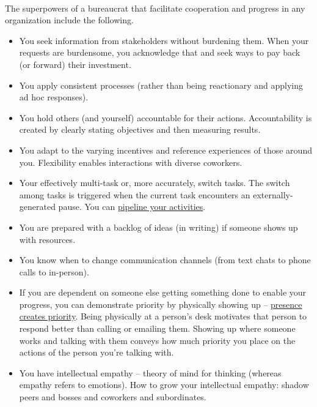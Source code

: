 \ \\

The superpowers of a bureaucrat that facilitate cooperation and progress in any organization include the following.
\begin{itemize}
\item You seek information from stakeholders without burdening them. When your requests are burdensome, you acknowledge that and seek ways to pay back (or forward) their investment.
\item You apply consistent processes (rather than being reactionary and applying ad hoc responses).
\item You hold others (and yourself) accountable for their actions. Accountability is created by clearly stating objectives and then measuring results.
\item You adapt to the varying incentives and reference experiences of those around you. Flexibility enables interactions with diverse coworkers. 
    \item Your effectively multi-task or, more accurately, switch tasks. The switch among tasks is triggered when the current task encounters an externally-generated pause. You can \href{https://en.wikipedia.org/wiki/Pipeline_(computing)#Concept_and_motivation}{pipeline your activities}.
\iftoggle{WPinmargin}{\marginpar{$>$Wikipedia: pipeline (computing)}}{}
    \item You are prepared with a backlog of ideas (in writing) if someone shows up with resources.
    \item You know when to change communication channels (from text chats to phone calls to in-person). 
    \item If you are dependent on someone else getting something done to enable your progress, you can demonstrate priority by physically showing up -- \underline{presence creates priority}. 
    Being physically at a person's desk motivates that person to respond better than calling  or emailing them. Showing up where someone works and talking with them conveys how much priority you place on the actions of the person you're talking with.
    \item You have intellectual empathy -- theory of mind for thinking (whereas empathy refers to emotions). How to grow your intellectual empathy: shadow peers and bosses and coworkers and subordinates.

\end{itemize}
